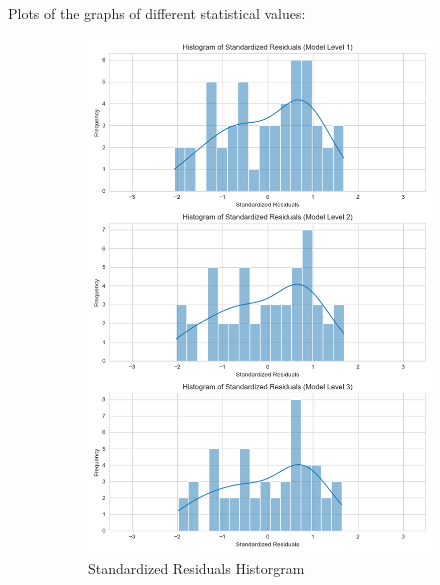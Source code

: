 \documentclass[11pt, oneside]{article}   	%
\begin{document}
Plots of the graphs of different statistical values:
\begin{figure}[H]
\centering
\begin{subfigure}{.5\textwidth}
  \centering
  \includegraphics[width=\linewidth]{../plots/full_data/hierarchy8/histogram_std_residuals}
  \caption{Standardized Residuals Historgram}
\end{subfigure}%
\begin{subfigure}{.5\textwidth}
  \centering

\end{subfigure}
\end{figure}
\end{document}
